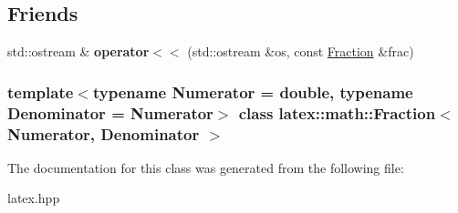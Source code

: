 \subsection*{\-Friends}
\begin{DoxyCompactItemize}
\item 
\hypertarget{classlatex_1_1math_1_1Fraction_a9313ed58249557fab9c0b6ab5e5f977f}{std\-::ostream \& {\bfseries operator$<$$<$} (std\-::ostream \&os, const \hyperlink{classlatex_1_1math_1_1Fraction}{\-Fraction} \&frac)}\label{classlatex_1_1math_1_1Fraction_a9313ed58249557fab9c0b6ab5e5f977f}

\end{DoxyCompactItemize}
\subsubsection*{template$<$typename \-Numerator = double, typename \-Denominator = \-Numerator$>$ class latex\-::math\-::\-Fraction$<$ Numerator, Denominator $>$}



\-The documentation for this class was generated from the following file\-:\begin{DoxyCompactItemize}
\item 
latex.\-hpp\end{DoxyCompactItemize}
